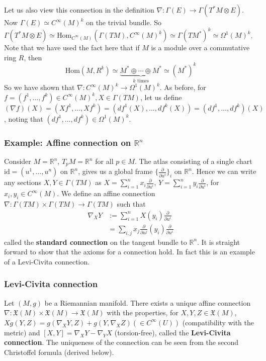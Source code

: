 \documentclass[a4paper]{article}
\theoremstyle{definition} \newtheorem*{definition}{Definition}
\theoremstyle{definition} \newtheorem*{definitions}{Definitions}
\theoremstyle{plain} \newtheorem{theorem}{Theorem}[section]
\theoremstyle{plain} \newtheorem{proposition}[theorem]{Proposition}
\theoremstyle{plain} \newtheorem{corollary}[theorem]{Corollary}
\theoremstyle{plain} \newtheorem{lemma}[theorem]{Lemma}
\theoremstyle{plain} \newtheorem{example}[theorem]{Example}
\newcommand{\defn}[1]{\textbf{#1}}
\newcommand{\realnos}{\mathbb{R}}
\newcommand{\Hom}{\text{Hom}}
\newcommand{\smooth}{C^\infty}
\begin{document}
Let us also view this connection in the definition $\nabla:\Gamma(E)\to \Gamma(T^*M\otimes E)$. Now $\Gamma(E)\simeq \smooth(M)^k$ on the trivial bundle. So  $\Gamma(T^*M\otimes E)\simeq \Hom_{\smooth(M)}(\Gamma(TM), \smooth(M)^k)\simeq \Gamma(TM^*)^k \simeq \Omega^1(M)^k$. Note that we have used the fact here that if $M$ is a module over a commutative ring $R$, then 
$$\Hom(M, R^k)\simeq \underbrace{M^*\oplus \cdots \oplus M^*}_{k \text{ times}} \simeq (M^*)^{k}$$
So we have shown that $\nabla:\smooth(M)^k\to \Omega^1(M)^k$. As before, for $f=(f^1, \ldots, f^k)\in \smooth(M)^k, X\in \Gamma(TM)$, let us define $(\nabla f)(X)=(Xf^1, \ldots, Xf^k)=(df^1(X), \ldots, df^k(X))=(df^1, \ldots, df^k)(X)$, noting that $(df^1, \ldots, df^k)\in \Omega^1(M)^k$.

\subsubsection{Example: Affine connection on $\realnos^n$}
Consider $M=\realnos^n$, $T_pM=\realnos^n$ for all $p\in M$.
The atlas consisting of a single chart $\text{id}=(u^1, \ldots, u^n)$ on $\realnos^n$, gives us a global frame $\{\frac{\partial}{\partial u^i}\}_i$ on $\realnos^n$. Hence we can write any sections $X, Y\in \Gamma(TM)$ as $X=\sum_{i=1}^n x_i \frac{\partial}{\partial u^i}$, $Y=\sum_{i=1}^n y_i \frac{\partial}{\partial u^i}$, for $x_i, y_i \in \smooth(M)$. We define an affine connection $\nabla:\Gamma(TM)\times \Gamma(TM)\to \Gamma(TM)$ such that 
\begin{align*}
\nabla_X Y & := \sum_{i=1}^n X(y_i) \frac{\partial}{\partial u^i} \\
& = \sum_{i, j} x_j\frac{\partial}{\partial u^j}(y_i)\frac{\partial}{\partial u^i}
\end{align*}
called the \defn{standard connection} on the tangent bundle to $\realnos^n$. It is straight forward to show that the axioms for a connection hold. In fact this is an example of a Levi-Civita connection.

\subsubsection{Levi-Civita connection}
Let $(M, g)$ be a Riemannian manifold. There exists a unique affine connection $\nabla:\mathfrak{X}(M)\times \mathfrak{X}(M)\to \mathfrak{X}(M)$ with the properties, for $X,Y,Z\in \mathfrak{X}(M)$,
$Xg(Y,Z)=g(\nabla_XY, Z)+g(Y, \nabla_XZ) (\in C^\infty(U))$ (compatibility with the metric) and $[X,Y]=\nabla_XY-\nabla_YX$ (torsion-free), called the \defn{Levi-Civita connection}. The uniqueness of the connection can be seen from the second Christoffel formula (derived below). 
\end{document}
